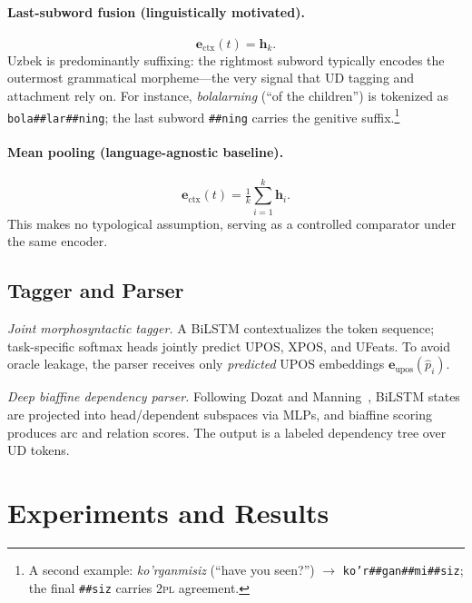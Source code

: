 \documentclass[runningheads]{llncs}
\begin{document}
\paragraph{Last-subword fusion (linguistically motivated).}
\begin{equation}
  \mathbf{e}_{\text{ctx}}(t) = \mathbf{h}_k .
  \label{eq:lastsub}
\end{equation}
Uzbek is predominantly suffixing: the rightmost subword typically encodes the outermost grammatical morpheme---the very signal that UD tagging and attachment rely on.
For instance, \textit{bolalarning} (``of the children'') is tokenized as \texttt{bola\;\#\#lar\;\#\#ning}; the last subword \texttt{\#\#ning} carries the genitive suffix.\footnote{A second example: \textit{ko'rganmisiz} (``have you seen?'') $\to$ \texttt{ko'r\;\#\#gan\;\#\#mi\;\#\#siz}; the final \texttt{\#\#siz} carries 2\textsc{pl} agreement.}

\paragraph{Mean pooling (language-agnostic baseline).}
\begin{equation}
  \mathbf{e}_{\text{ctx}}(t) = \tfrac{1}{k}\textstyle\sum_{i=1}^{k}\mathbf{h}_i .
  \label{eq:meanpool}
\end{equation}
This makes no typological assumption, serving as a controlled comparator under the same encoder.

\subsection{Tagger and Parser}
\label{sec:method_models}

\textit{Joint morphosyntactic tagger.}
A BiLSTM contextualizes the token sequence; task-specific softmax heads jointly predict UPOS, XPOS, and UFeats.
To avoid oracle leakage, the parser receives only \emph{predicted} UPOS embeddings $\mathbf{e}_{\text{upos}}(\hat{p}_i)$.

\textit{Deep biaffine dependency parser.}
Following Dozat and Manning~\cite{DBLP:conf/iclr/DozatM17}, BiLSTM states are projected into head/dependent subspaces via MLPs, and biaffine scoring produces arc and relation scores. The output is a labeled dependency tree over UD tokens.

\section{Experiments and Results}
\label{sec:experiments}
\end{document}
